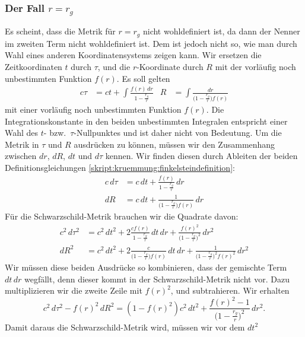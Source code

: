 \subsubsection{Der Fall $r=r_g$}
Es scheint, dass die Metrik für $r=r_g$ nicht wohldefiniert ist,
da dann der Nenner im zweiten Term nicht wohldefiniert ist.
Dem ist jedoch nicht so, wie man durch Wahl eines anderen Koordinatensystems
zeigen kann.
Wir ersetzen die Zeitkoordinaten $t$ durch $\tau$, und die $r$-Koordinate
durch $R$ mit der vorläufig noch unbestimmten Funktion $f(r)$.
Es soll gelten
\begin{align}
c\tau
&=
ct + \int\frac{f(r)\,dr}{\displaystyle 1-\frac{r_g}{r}}
&
R
&=
\int\frac{dr}{\displaystyle \biggl(1-\frac{r_g}{r}\biggr)f(r)}
\label{skript:kruemmung:finkelsteindefinition}
\end{align}
mit einer vorläufig noch unbestimmten Funktion $f(r)$.
Die Integrationskonstante in den beiden unbestimmten Integralen
entspricht einer Wahl des $t$- bzw.~$\tau$-Nullpunktes und ist
daher nicht von Bedeutung.
Um die Metrik in $\tau$ und $R$ ausdrücken zu können, müssen wir 
den Zusammenhang zwischen $dr$, $dR$, $dt$ und $d\tau$ kennen.
Wir finden diesen durch Ableiten der beiden Definitionsgleichungen
\eqref{skript:kruemmung:finkelsteindefinition}:
\begin{align*}
c\,d\tau
&=
c\,dt + \frac{f(r)}{\displaystyle 1-\frac{r_g}{r}}\,dr
\\
dR
&=
c\,dt
+
\frac{1}{\displaystyle\biggl(1-\frac{r_g}{r}\biggr)f(r)}\,dr
\end{align*}
Für die Schwarzschild-Metrik brauchen wir die Quadrate davon:
\begin{align*}
c^2\,d\tau ^2
&=
c^2\,dt^2 + 2\frac{cf(r)}{\displaystyle 1-\frac{r_g}{r}}\,dt\,dr
+\frac{f(r)^2}{\biggl(\displaystyle 1-\frac{r_g}{r}\biggr)^2}\,dr^2
\\
dR^2
&=
c^2\,dt^2 + 2\frac{c}{\displaystyle\biggl(1-\frac{r_g}{r}\biggr)f(r)}\,dt\,dr
+
\frac{1}{\displaystyle \biggl(1-\frac{r_g}{r}\biggr)^2f(r)^2}\,dr^2
\end{align*}
Wir müssen diese beiden Ausdrücke so kombinieren, dass der gemischte
Term $dt\,dr$ wegfällt, denn dieser kommt in der Schwarzschild-Metrik
nicht vor.
Dazu multiplizieren wir die zweite Zeile mit $f(r)^2$, und subtrahieren.
Wir erhalten
\begin{equation}
c^2\,d\tau^2 - f(r)^2\,dR^2
=
(1-f(r)^2)c^2\,dt^2
+\frac{f(r)^2-1}{\displaystyle\biggl(1-\frac{r_g}{r}\biggr)^2}\,dr^2.
\end{equation}
Damit daraus die Schwarzschild-Metrik wird, müssen wir vor dem $dt^2$
